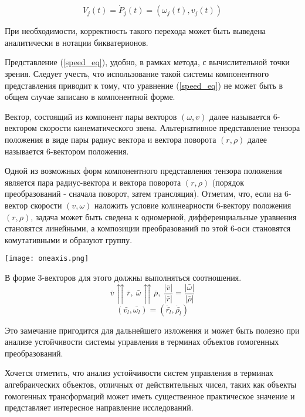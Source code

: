 \begin{equation}\label{speed_eq_comp} 
V_j(t) = \dot{P}_j(t) = (\omega_j(t),v_j(t)) 
\end{equation}

При необходимости, корректность такого перехода может быть выведена аналитически в нотации бикватерионов. 

Представление (\ref{speed_eq}), удобно, в рамках метода, с вычислительной точки зрения. Следует учесть, что использование такой системы компонентного представления приводит к тому, что уравнение (\ref{speed_eq}) не может быть в общем случае записано в компонентной форме.

\colorbox{shadecolor}
{\parbox{0.9\textwidth}{Вектор, состоящий из компонент пары векторов $(\omega, v)$ далее называется 6-вектором скорости кинематического звена. Альтернативное представление тензора положения в виде пары радиус вектора и вектора поворота $(r,\rho)$ далее называется 6-вектором положения.}}

Одной из возможных форм компонентного представления тензора положения является пара радиус-вектора и вектора поворота $(r,\rho)$ (порядок преобразований - сначала поворот, затем трансляция). Отметим, что, если на 6-вектор скорости $(v,\omega)$ наложить условие колинеарности 6-вектору положения $(r,\rho)$, задача может быть сведена к одномерной, дифференциальные уравнения становятся линейными, а композиции преобразований по этой 6-оси становятся комутативными и образуют группу. 
\begin{center}
  \texttt{[image: oneaxis.png]}
  \label{}
\end{center}

В форме 3-векторов для этого должны выполняться соотношения.
\begin{equation}\label{} 
\bar{v} \upuparrows \bar{r}, \  \bar{\omega} \upuparrows \bar{\rho}, \  \frac{|\bar{v}|}{|\bar{r}|} = \frac{|\bar{\omega}|}{|\bar{\rho}|} 
\end{equation}
\begin{equation}
(\bar{v_l},\bar{\omega_l}) = (\dot{\bar{r_l}},\dot{\bar{\rho_l}})
\end{equation}

Это замечание пригодится для дальнейшего изложения и может быть полезно при анализе устойчивости системы управления в терминах объектов гомогенных преобразований. 

Хочется отметить, что анализ устойчивости систем управления в терминах алгебраических объектов, отличных от действительных чисел, таких как объекты гомогенных трансформаций может иметь существенное практическое значение и представляет интересное направление исследований.